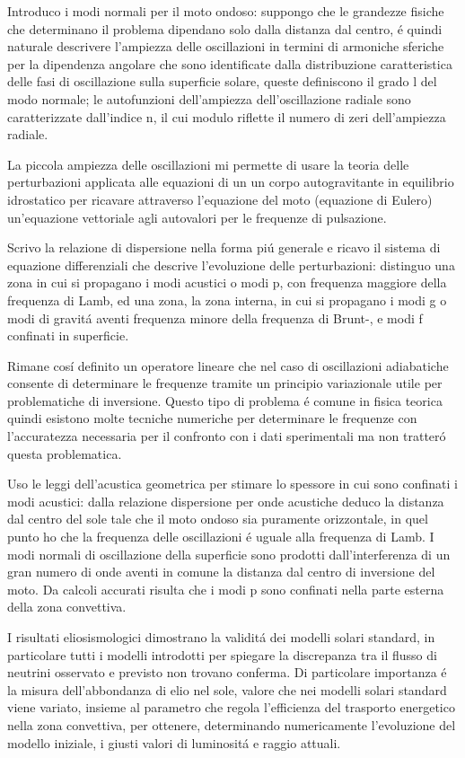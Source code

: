 \documentclass[../main.tex]{subfiles}
\begin{document}
Introduco i modi normali per il moto ondoso: suppongo che le grandezze fisiche che determinano il problema dipendano solo dalla distanza dal centro, \'e quindi naturale descrivere l'ampiezza delle oscillazioni  in termini di armoniche sferiche per la dipendenza angolare che sono identificate dalla distribuzione caratteristica delle fasi di oscillazione sulla superficie solare, queste definiscono il grado l del modo normale; le autofunzioni dell'ampiezza dell'oscillazione radiale sono caratterizzate dall'indice n, il cui modulo riflette il numero di zeri dell'ampiezza radiale.


La piccola ampiezza delle oscillazioni mi permette di usare la teoria delle perturbazioni applicata alle equazioni di un un corpo autogravitante in equilibrio idrostatico per ricavare attraverso l'equazione del moto (equazione di Eulero) un'equazione vettoriale agli autovalori per le frequenze di pulsazione. 

Scrivo la relazione di dispersione nella forma pi\'u generale e ricavo il sistema di equazione differenziali che descrive l'evoluzione delle perturbazioni: distinguo una zona in cui si propagano i modi acustici o modi p, con frequenza maggiore della frequenza di Lamb, ed una zona, la zona interna, in cui si propagano i modi g o modi di gravit\'a aventi frequenza minore della frequenza di Brunt-\vai{}, e modi f confinati in superficie. 

Rimane cos\'i definito un operatore lineare che nel caso di oscillazioni adiabatiche consente di determinare le frequenze tramite un principio variazionale utile per problematiche di inversione. Questo tipo di problema \'e comune in fisica teorica quindi esistono molte tecniche numeriche per determinare le frequenze con l'accuratezza necessaria per il confronto con i dati sperimentali ma non tratter\'o questa problematica.

Uso le leggi dell'acustica geometrica per stimare lo spessore in cui sono confinati i modi acustici: dalla relazione dispersione per onde acustiche deduco la distanza dal centro del sole tale che il moto ondoso sia puramente orizzontale, in quel punto ho che la frequenza delle oscillazioni \'e uguale alla frequenza di Lamb. I modi normali di oscillazione della superficie sono prodotti dall'interferenza di un gran numero di onde aventi in comune la distanza dal centro di inversione del moto. Da calcoli accurati risulta che i modi p sono confinati nella parte esterna della zona convettiva. 

I risultati eliosismologici dimostrano la validit\'a dei modelli solari standard, in particolare tutti i modelli introdotti per spiegare la discrepanza tra il flusso di neutrini osservato e previsto non trovano conferma. Di particolare importanza \'e la  misura  dell'abbondanza di elio nel sole, valore che nei modelli solari standard viene variato, insieme al parametro che regola l'efficienza del trasporto energetico nella zona convettiva, per ottenere, determinando numericamente l'evoluzione del modello iniziale, i giusti valori di luminosit\'a e raggio attuali.
\end{document}
